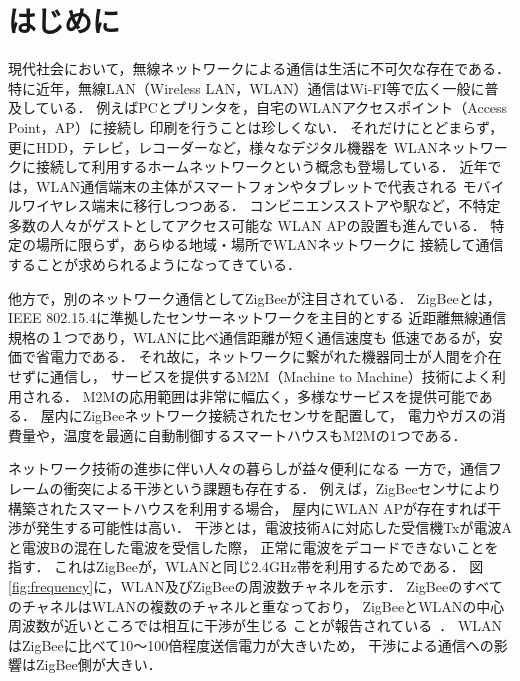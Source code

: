 \documentclass[12pt]{jreport}
\begin{document}
\chapter{はじめに}\label{intro}%
現代社会において，無線ネットワークによる通信は生活に不可欠な存在である．
特に近年，無線LAN（Wireless LAN，WLAN）通信はWi-FI等で広く一般に普及している．
例えばPCとプリンタを，自宅のWLANアクセスポイント（Access Point，AP）に接続し
印刷を行うことは珍しくない．
それだけにとどまらず，更にHDD，テレビ，レコーダーなど，様々なデジタル機器を
WLANネットワークに接続して利用するホームネットワークという概念も登場している．
近年では，WLAN通信端末の主体がスマートフォンやタブレットで代表される
モバイルワイヤレス端末に移行しつつある．
コンビニエンスストアや駅など，不特定多数の人々がゲストとしてアクセス可能な
WLAN APの設置も進んでいる．
特定の場所に限らず，あらゆる地域・場所でWLANネットワークに
接続して通信することが求められるようになってきている．

他方で，別のネットワーク通信としてZigBeeが注目されている．
ZigBeeとは，IEEE 802.15.4に準拠したセンサーネットワークを主目的とする
近距離無線通信規格の１つであり，WLANに比べ通信距離が短く通信速度も
低速であるが，安価で省電力である．
それ故に，ネットワークに繋がれた機器同士が人間を介在せずに通信し，
サービスを提供するM2M（Machine to Machine）技術によく利用される．
M2Mの応用範囲は非常に幅広く，多様なサービスを提供可能である．
屋内にZigBeeネットワーク接続されたセンサを配置して，
電力やガスの消費量や，温度を最適に自動制御するスマートハウスもM2Mの1つである．

ネットワーク技術の進歩に伴い人々の暮らしが益々便利になる
一方で，通信フレームの衝突による干渉という課題も存在する．
例えば，ZigBeeセンサにより構築されたスマートハウスを利用する場合，
屋内にWLAN APが存在すれば干渉が発生する可能性は高い．
干渉とは，電波技術Aに対応した受信機Txが電波Aと電波Bの混在した電波を受信した際，
正常に電波をデコードできないことを指す．
これはZigBeeが，WLANと同じ2.4GHz帯を利用するためである．
図\ref{fig:frequency}に，WLAN及びZigBeeの周波数チャネルを示す．
ZigBeeのすべてのチャネルはWLANの複数のチャネルと重なっており，
ZigBeeとWLANの中心周波数が近いところでは相互に干渉が生じる
ことが報告されている~\cite{shuaib06:wifi_zigbee}．
WLANはZigBeeに比べて10〜100倍程度送信電力が大きいため，
干渉による通信への影響はZigBee側が大きい．
\end{document}
